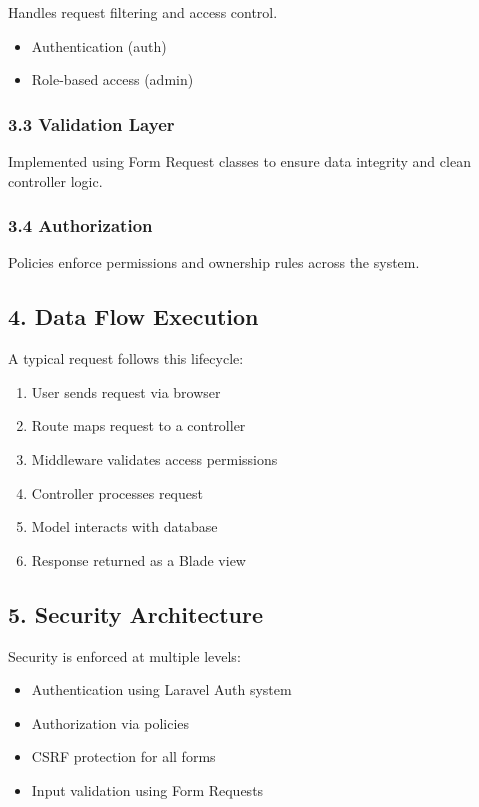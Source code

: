 \documentclass[12pt,a4paper]{article}
\begin{document}
Handles request filtering and access control.

\begin{itemize}[noitemsep]
    \item Authentication (auth)
    \item Role-based access (admin)
\end{itemize}

\subsubsection{3.3 Validation Layer}

Implemented using Form Request classes to ensure data integrity and clean controller logic.

\subsubsection{3.4 Authorization}

Policies enforce permissions and ownership rules across the system.

\subsection{4. Data Flow Execution}

A typical request follows this lifecycle:

\begin{enumerate}[noitemsep]
    \item User sends request via browser
    \item Route maps request to a controller
    \item Middleware validates access permissions
    \item Controller processes request
    \item Model interacts with database
    \item Response returned as a Blade view
\end{enumerate}

\subsection{5. Security Architecture}

Security is enforced at multiple levels:

\begin{itemize}[noitemsep]
    \item Authentication using Laravel Auth system
    \item Authorization via policies
    \item CSRF protection for all forms
    \item Input validation using Form Requests
\end{itemize}
\end{document}
